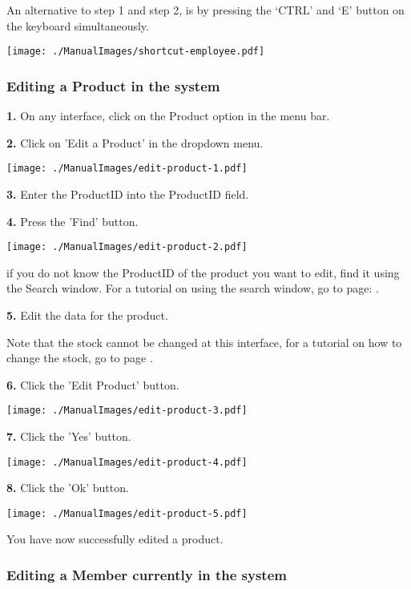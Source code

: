 An alternative to step 1 and step 2, is by pressing the `CTRL' and `E' button on the keyboard simultaneously.

\texttt{[image: ./ManualImages/shortcut-employee.pdf]}

\pagebreak
\subsubsection{Editing a Product in the system}
\label{fig:Editing a Product in the system}

\textbf{1.} On any interface, click on the Product option in the menu bar.

\textbf{2.} Click on 'Edit a Product' in the dropdown menu.

\texttt{[image: ./ManualImages/edit-product-1.pdf]}

\textbf{3.} Enter the ProductID into the ProductID field. 

\textbf{4.} Press the 'Find' button.

\texttt{[image: ./ManualImages/edit-product-2.pdf]}

if you do not know the ProductID of the product you want to edit, find it using the Search window. For a tutorial on using the search window, go to page: . 

\textbf{5.} Edit the data for the product.

Note that the stock cannot be changed at this interface, for a tutorial on how to change the stock, go to page .

\textbf{6.} Click the 'Edit Product' button.

\texttt{[image: ./ManualImages/edit-product-3.pdf]}

\textbf{7.} Click the 'Yes' button.

\texttt{[image: ./ManualImages/edit-product-4.pdf]}

\textbf{8.} Click the 'Ok' button.

\texttt{[image: ./ManualImages/edit-product-5.pdf]}

You have now successfully edited a product.


\pagebreak
\subsubsection{Editing a Member currently in the system}
\label{fig:Editing a Member currently in the system}

